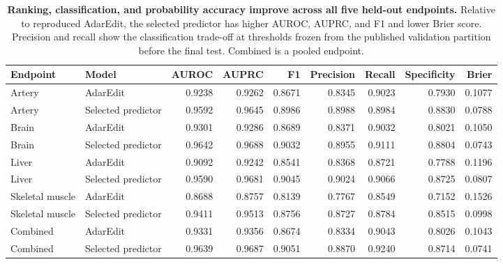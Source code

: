 \begin{table}[H]
\centering
\caption{\textbf{Ranking, classification, and probability accuracy improve across all five held-out endpoints.} Relative to reproduced AdarEdit, the selected predictor has higher AUROC, AUPRC, and F1 and lower Brier score. Precision and recall show the classification trade-off at thresholds frozen from the published validation partition before the final test. Combined is a pooled endpoint.}\label{tab:lockedmetrics}
\begin{tabular}{l@{\hspace{2\tabcolsep}\hspace{0.6em}}lrrrrrrr}
\toprule
Endpoint & Model & AUROC & AUPRC & F1 & Precision & Recall & Specificity & Brier \\
\midrule
Artery & AdarEdit & 0.9238 & 0.9262 & 0.8671 & 0.8345 & 0.9023 & 0.7930 & 0.1077 \\
Artery & Selected predictor & 0.9592 & 0.9645 & 0.8986 & 0.8988 & 0.8984 & 0.8830 & 0.0788 \\
Brain & AdarEdit & 0.9301 & 0.9286 & 0.8689 & 0.8371 & 0.9032 & 0.8021 & 0.1050 \\
Brain & Selected predictor & 0.9642 & 0.9688 & 0.9032 & 0.8955 & 0.9111 & 0.8804 & 0.0743 \\
Liver & AdarEdit & 0.9092 & 0.9242 & 0.8541 & 0.8368 & 0.8721 & 0.7788 & 0.1196 \\
Liver & Selected predictor & 0.9590 & 0.9681 & 0.9045 & 0.9024 & 0.9066 & 0.8725 & 0.0807 \\
Skeletal muscle & AdarEdit & 0.8688 & 0.8757 & 0.8139 & 0.7767 & 0.8549 & 0.7152 & 0.1526 \\
Skeletal muscle & Selected predictor & 0.9411 & 0.9513 & 0.8756 & 0.8727 & 0.8784 & 0.8515 & 0.0998 \\
Combined & AdarEdit & 0.9331 & 0.9356 & 0.8674 & 0.8334 & 0.9043 & 0.8026 & 0.1043 \\
Combined & Selected predictor & 0.9639 & 0.9687 & 0.9051 & 0.8870 & 0.9240 & 0.8714 & 0.0741 \\
\bottomrule
\end{tabular}
\end{table}
